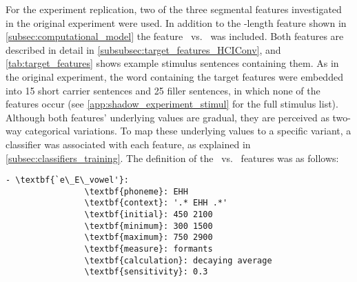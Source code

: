 For the experiment replication, two of the three segmental features investigated in the original experiment were used.
In addition to the -length feature shown in \cref{subsec:computational_model} the feature \textipa{[E:]}~vs.~\textipa{[e:]} was included.
Both features are described in detail in \cref{subsubsec:target_features_HCIConv}, and \cref{tab:target_features} shows example stimulus sentences containing them.
As in the original experiment, the word containing the target features were embedded into 15 short carrier sentences and 25 filler sentences, in which none of the features occur (see \cref{app:shadow_experiment_stimul} for the full stimulus list).
Although both features' underlying values are gradual, they are perceived as two-way categorical variations.
To map these underlying values to a specific variant, a classifier was associated with each feature, as explained in \cref{subsec:classifiers_training}.
The definition of the \textipa{[E:]}~vs.~\textipa{[e:]} features was as follows:
%
%
{
	\small
	\begin{Verbatim}[tabsize=4, commandchars=\\\{\}]
		- \textbf{`e\_E\_vowel'}:
				\textbf{phoneme}: EHH
				\textbf{context}: '.* EHH .*'
				\textbf{initial}: 450 2100
				\textbf{minimum}: 300 1500
				\textbf{maximum}: 750 2900
				\textbf{measure}: formants
				\textbf{calculation}: decaying average
				\textbf{sensitivity}: 0.3
	\end{Verbatim}
}
%
